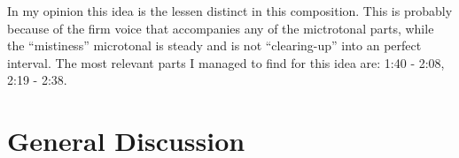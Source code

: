 \documentclass[a4paper,11pt]{article}
\begin{document}
In my opinion this idea is the lessen distinct in this composition.
This is probably because of the firm voice that accompanies any of the mictrotonal parts, while the ``mistiness'' microtonal is steady and is not ``clearing-up'' into an perfect interval.
The most relevant parts I managed to find for this idea are: 1:40 - 2:08, 2:19 - 2:38.

\section{General Discussion}
\label{sec:general_discussion}

\printbibliography[title={Bibliography}]
\end{document}
